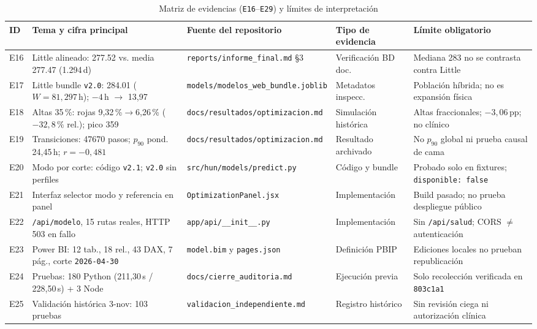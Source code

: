 \begin{table}[t]
\caption{Matriz de evidencias (\texttt{E16}--\texttt{E29}) y límites de interpretación}
\label{tab:anexo_matriz_b}
\centering
\scriptsize
\begin{tabularx}{\textwidth}{@{}L{0.04\textwidth} L{0.27\textwidth} L{0.24\textwidth} L{0.15\textwidth} Y@{}}
\toprule
ID & Tema y cifra principal & Fuente del repositorio & Tipo de evidencia & Límite obligatorio \\
\midrule
E16 & Little alineado: \num{277,52} vs. media \num{277,47} (1.294\,d) & \nolinkurl{reports/informe_final.md} \S3 & Verificación BD doc. & Mediana 283 no se contrasta contra Little \\
E17 & Little bundle \texttt{v2.0}: \num{284,01} ($W=81{,}297$\,h); $-4$\,h $\rightarrow$ 13,97 & \nolinkurl{models/modelos_web_bundle.joblib} & Metadatos inspecc. & Población híbrida; no es expansión física \\
E18 & Altas 35\,\%: rojas 9,32\,\%$\rightarrow$6,26\,\% ($-32{,}8\,\%$ rel.); pico 359 & \nolinkurl{docs/resultados/optimizacion.md} & Simulación histórica & Altas fraccionales; $-3{,}06$\,pp; no clínico \\
E19 & Transiciones: \num{47670} pasos; $p_{90}$ pond. 24,45\,h; $r=-0{,}481$ & \nolinkurl{docs/resultados/optimizacion.md} & Resultado archivado & No $p_{90}$ global ni prueba causal de cama \\
E20 & Modo por corte: código \texttt{v2.1}; \texttt{v2.0} sin perfiles & \nolinkurl{src/hun/models/predict.py} & Código y bundle & Probado solo en fixtures; \texttt{disponible: false} \\
E21 & Interfaz selector modo y referencia en panel & \nolinkurl{OptimizationPanel.jsx} & Implementación & Build pasado; no prueba despliegue público \\
E22 & \texttt{/api/modelo}, 15 rutas reales, HTTP 503 en fallo & \nolinkurl{app/api/__init__.py} & Implementación & Sin \texttt{/api/salud}; CORS $\ne$ autenticación \\
E23 & Power BI: 12 tab., 18 rel., 43 DAX, 7 pág., corte \texttt{2026-04-30} & \nolinkurl{model.bim} y \nolinkurl{pages.json} & Definición PBIP & Ediciones locales no prueban republicación \\
E24 & Pruebas: 180 Python (211,30\,s / 228,50\,s) + 3 Node & \nolinkurl{docs/cierre_auditoria.md} & Ejecución previa & Solo recolección verificada en \texttt{803c1a1} \\
E25 & Validación histórica 3-nov: 103 pruebas & \nolinkurl{validacion_independiente.md} & Registro histórico & Sin revisión ciega ni autorización clínica \\

\end{tabularx}
\end{table}
